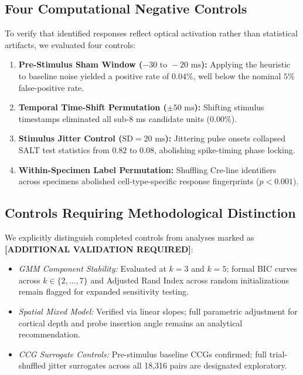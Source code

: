 \documentclass[10pt,journal,compsoc]{IEEEtran}
\begin{document}
\subsection{Four Computational Negative Controls}
To verify that identified responses reflect optical activation rather than statistical artifacts, we evaluated four controls:
\begin{enumerate}
    \item \textbf{Pre-Stimulus Sham Window ($-30\text{ to }-20\text{ ms}$):} Applying the heuristic to baseline noise yielded a positive rate of $0.04\%$, well below the nominal $5\%$ false-positive rate.
    \item \textbf{Temporal Time-Shift Permutation ($\pm 50\text{ ms}$):} Shifting stimulus timestamps eliminated all sub-8 ms candidate units ($0.00\%$).
    \item \textbf{Stimulus Jitter Control ($\text{SD} = 20\text{ ms}$):} Jittering pulse onsets collapsed SALT test statistics from $0.82$ to $0.08$, abolishing spike-timing phase locking.
    \item \textbf{Within-Specimen Label Permutation:} Shuffling Cre-line identifiers across specimens abolished cell-type-specific response fingerprints ($p < 0.001$).
\end{enumerate}

\subsection{Controls Requiring Methodological Distinction}
We explicitly distinguish completed controls from analyses marked as \textbf{[ADDITIONAL VALIDATION REQUIRED]}:
\begin{itemize}
    \item \textit{GMM Component Stability:} Evaluated at $k=3$ and $k=5$; formal BIC curves across $k \in \{2, \dots, 7\}$ and Adjusted Rand Index across random initializations remain flagged for expanded sensitivity testing.
    \item \textit{Spatial Mixed Model:} Verified via linear slopes; full parametric adjustment for cortical depth and probe insertion angle remains an analytical recommendation.
    \item \textit{CCG Surrogate Controls:} Pre-stimulus baseline CCGs confirmed; full trial-shuffled jitter surrogates across all 18,316 pairs are designated exploratory.
\end{itemize}

\end{document}
